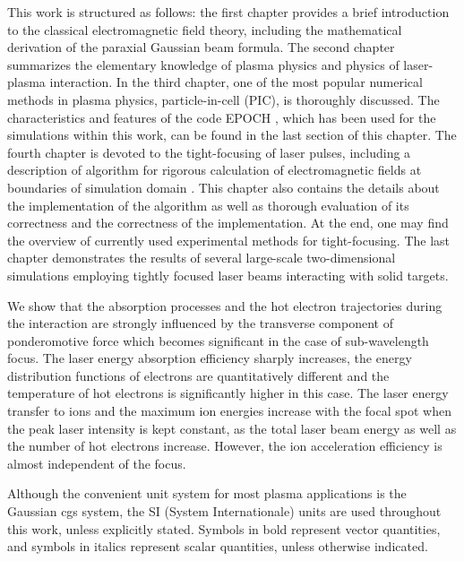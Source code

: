 This work is structured as follows: the first chapter provides a brief introduction to the classical electromagnetic field theory, including the mathematical derivation of the paraxial Gaussian beam formula. The second chapter summarizes the elementary knowledge of plasma physics and physics of laser-plasma interaction. In the third chapter, one of the most popular numerical methods in plasma physics, particle-in-cell (PIC), is thoroughly discussed. The characteristics and features of the code EPOCH \cite{bennett}, which has been used for the simulations within this work, can be found in the last section of this chapter. The fourth chapter is devoted to the tight-focusing of laser pulses, including a description of algorithm for rigorous calculation of electromagnetic fields at boundaries of simulation domain \cite{Thiele2016}. This chapter also contains the details about the implementation of the algorithm as well as thorough evaluation of its correctness and the correctness of the implementation. At the end, one may find the overview of currently used experimental methods for tight-focusing. The last chapter demonstrates the results of several large-scale two-dimensional simulations employing tightly focused laser beams interacting with solid targets.

We show that the absorption processes and the hot electron trajectories during the interaction are strongly influenced by the transverse component of ponderomotive force which becomes significant in the case of sub-wavelength focus. The laser energy absorption efficiency sharply increases, the energy distribution functions of electrons are quantitatively different and the temperature of hot electrons is significantly higher in this case. The laser energy transfer to ions and the maximum ion energies increase with the focal spot when the peak laser intensity is kept constant, as the total laser beam energy as well as the number of hot electrons increase. However, the ion acceleration efficiency is almost independent of the focus.

Although the convenient unit system for most plasma applications is the Gaussian cgs system, the SI (System Internationale) units are used throughout this work, unless explicitly stated. Symbols in bold represent vector quantities, and symbols in italics represent scalar quantities, unless otherwise indicated.
